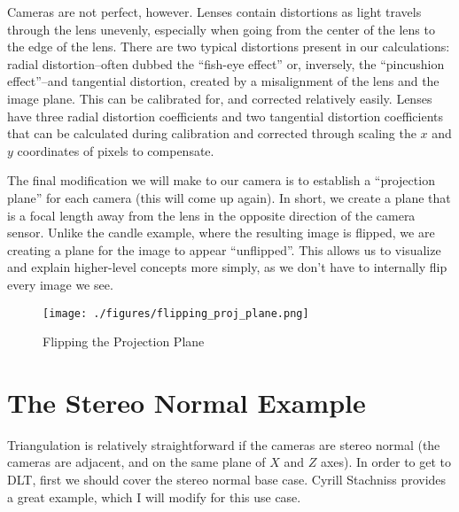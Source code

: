 \documentclass[
    12pt,
    twoside,
    bibstyle=chicago,
    headerstyle=uppercase,
	bibfile=biblatex_updating.bib
]{reedthesis}
\begin{document}
Cameras are not perfect, however. Lenses contain distortions as light travels through the lens unevenly, especially when going from the center of the lens to the edge of the lens. There are two typical distortions present in our calculations: radial distortion--often dubbed the “fish-eye effect” or, inversely, the “pincushion effect”--and tangential distortion, created by a misalignment of the lens and the image plane. This can be calibrated for, and corrected relatively easily. Lenses have three radial distortion coefficients and two tangential distortion coefficients that can be calculated during calibration and corrected through scaling the $x$ and $y$ coordinates of pixels to compensate.


The final modification we will make to our camera is to establish a “projection plane” for each camera (this will come up again). In short, we create a plane that is a focal length away from the lens in the opposite direction of the camera sensor. Unlike the candle example, where the resulting image is flipped, we are creating a plane for the image to appear “unflipped”. This allows us to visualize and explain higher-level concepts more simply, as we don't have to internally flip every image we see.

\begin{figure}[h]
	    \centering
	    \texttt{[image: ./figures/flipping\_proj\_plane.png]}
		
	    \caption{Flipping the Projection Plane}
	 \label{Flipping the Projection Plane}
	\end{figure}

\section{The Stereo Normal Example}


Triangulation is relatively straightforward if the cameras are stereo normal (the cameras are adjacent, and on the same plane of $X$ and $Z$ axes). In order to get to DLT, first we should cover the stereo normal base case. Cyrill Stachniss provides a great example, which I will modify for this use case. \autocite{stachnissLecturePhotogrammetryII2021}
\end{document}

